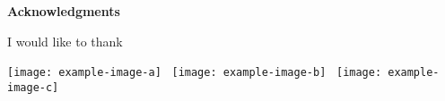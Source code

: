 \thispagestyle{empty}

\begin{center}
    {\Large \textbf{Acknowledgments}}
\end{center}

\vspace{2em}

\normalsize 

I would like to thank \lipsum[1]

\vspace{3em}

\begin{center}
    \texttt{[image: example-image-a]}~\hspace{2em}
    \texttt{[image: example-image-b]}~\hspace{2em}
    \texttt{[image: example-image-c]}
\end{center}

\restoregeometry
